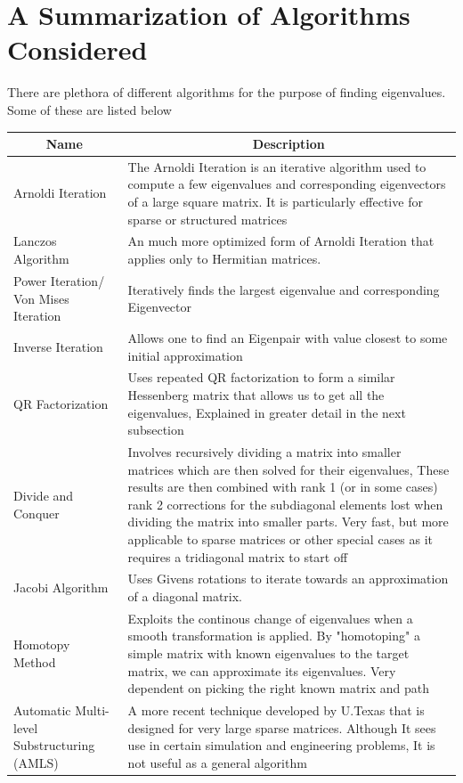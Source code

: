 \documentclass[12pt,a4paper]{article}
\begin{document}
\section{A Summarization of Algorithms Considered}

There are plethora of different algorithms for the purpose of finding eigenvalues. Some of these are listed below
{
\renewcommand{\arraystretch}{1.6}
\begin{center}
    \begin{tabularx}{\textwidth}{| X | X |}
        \hline
        \multicolumn{1}{|c|}{Name} & \multicolumn{1}{|c|}{Description} \\
        \hline
        Arnoldi Iteration & The Arnoldi Iteration is an iterative algorithm used to compute a few eigenvalues and corresponding eigenvectors of a large square matrix. It is particularly effective for sparse or structured matrices\\  
        \hline
        Lanczos Algorithm & An much more optimized form of Arnoldi Iteration that applies only to Hermitian matrices.\\  
        \hline
        Power Iteration/ Von Mises Iteration & Iteratively finds the largest eigenvalue and corresponding Eigenvector \\
        \hline
        Inverse Iteration & Allows one to find an Eigenpair with value closest to some initial approximation\\  
        \hline
        QR Factorization & Uses repeated QR factorization to form a similar Hessenberg matrix that allows us to get all the eigenvalues, Explained in greater detail in the next subsection\\  
        \hline
        Divide and Conquer & Involves recursively dividing a matrix into smaller matrices which are then solved for their eigenvalues, These results are then combined with rank 1 (or in some cases) rank 2 corrections for the subdiagonal elements lost when dividing the matrix into smaller parts. Very fast, but more applicable to sparse matrices or other special cases as it requires a tridiagonal matrix to start off\\  
        \hline
        Jacobi Algorithm & Uses Givens rotations to iterate towards an approximation of a diagonal matrix.\\  
        \hline
        Homotopy Method & Exploits the continous change of eigenvalues when a smooth transformation is applied. By "homotoping" a simple matrix with known eigenvalues to the target matrix, we can approximate its eigenvalues. Very dependent on picking the right known matrix and path \\    
        \hline
        Automatic Multi-level Substructuring \newline (AMLS) & A more recent technique developed by U.Texas that is designed for very large sparse matrices. Although It sees use in certain simulation and engineering problems, It is not useful as a general algorithm\\
        \hline
    \end{tabularx}
\end{center}}
\end{document}
